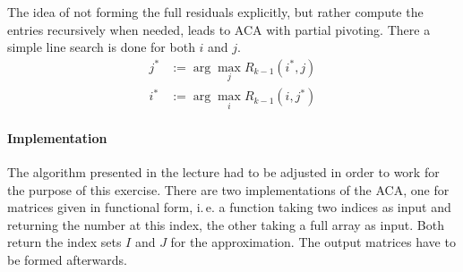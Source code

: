 \documentclass[%
a4paper,
parskip=half,
DIV=calc,
]
{scrartcl}
\begin{document}
The idea of not forming the full residuals explicitly, but rather
compute the entries recursively when needed, leads to ACA with partial
pivoting.  There a simple line search is done for both $i$ and $j$.
\begin{align*}
  j^* &:= \arg\max_j R_{k-1}(i^*, j) \\
  i^* &:= \arg\max_i R_{k-1}(i, j^*)
\end{align*}


\paragraph{Implementation}
The algorithm presented in the lecture had to be adjusted in order to
work for the purpose of this exercise.  There are two implementations
of the ACA, one for matrices given in functional form, i.\,e. a
function taking two indices as input and returning the number at this
index, the other taking a full array as input. Both return the index
sets $I$ and $J$ for the approximation. The output matrices have to be
formed afterwards.
\end{document}
